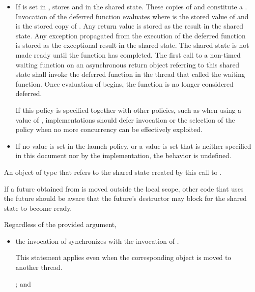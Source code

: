 \begin{itemdescr}
\begin{itemize}
\item
If  is set in ,
stores  and
in the shared state. These copies of  and  constitute
a . Invocation of the deferred function evaluates
 where  is the stored value of
 and  is the stored copy of
.
Any return value is stored
as the result in the shared state.
Any exception propagated
from the execution
of the deferred function
is stored as the exceptional result
in the shared state.
The shared state is not
made ready until the function has completed. The first call to a
non-timed waiting function
on an asynchronous return object referring to
this shared state shall invoke the
deferred function in the thread that called the waiting function.
Once evaluation of  begins, the function is no longer
considered deferred.
\begin{note} If this policy is specified together with other policies, such as when using a
 value of , implementations should defer
invocation or the selection of the policy when no more concurrency can be effectively
exploited. \end{note}

\item
If no value is set in the launch policy, or a value is set that is neither specified
in this document nor by the implementation, the behavior is undefined.
\end{itemize}

\pnum
\returns An object of type
 that refers
to the shared state created by this call to .
\begin{note} If a future obtained from  is moved outside the local scope,
other code that uses the future should be aware that the future's destructor may
block for the shared state to become ready. \end{note}

\pnum
\sync
Regardless of the provided  argument,
\begin{itemize}
\item
the invocation of 
synchronizes with the invocation of . \begin{note}
This statement applies even when the corresponding  object is moved to
another thread. \end{note}; and


\end{itemize}
\end{itemdescr}
